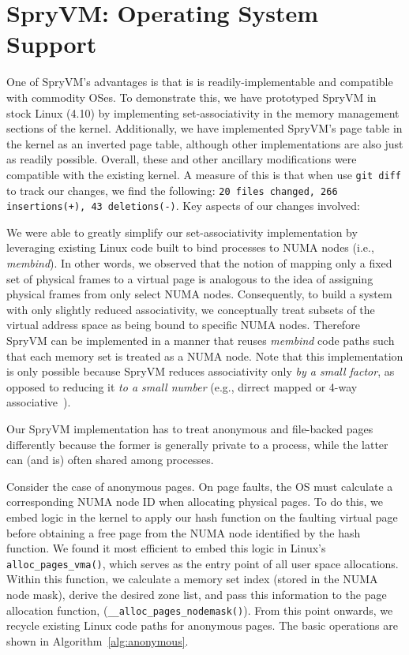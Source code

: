\section{SpryVM: Operating System Support}
\label{sec:os}

One of SpryVM's advantages is that is is readily-implementable and
compatible with commodity OSes. To demonstrate this, we have
prototyped SpryVM in stock Linux (4.10) by implementing set-associativity in
the memory management sections of the kernel. Additionally, we have
implemented SpryVM's page table in the kernel as an inverted page table,
although other implementations are also just as readily possible. 
Overall, these and other ancillary
modifications were compatible with the existing kernel. A measure of
this is that when use \verb|git diff| to track our changes, we find
the following: \texttt{20 files changed, 266 insertions(+), 43
  deletions(-)}. Key aspects of our changes involved:

\vspace{2mm}
 We were
able to greatly simplify our set-associativity implementation by
leveraging existing Linux code built to bind processes to NUMA nodes
(i.e., {\it membind}). In other words, we observed that the notion of
mapping only a fixed set of physical frames to a virtual page is
analogous to the idea of assigning physical frames from only select
NUMA nodes. Consequently, to build a system with only slightly reduced associativity, 
we conceptually treat subsets of the virtual address space as being bound to specific
NUMA nodes. Therefore SpryVM can be implemented in a manner that
reuses {\it membind} code paths such that each memory set is treated
as a NUMA node. Note that this implementation is only possible because SpryVM
reduces associativity only \textit{by a small factor}, as opposed to reducing it
\textit{to a small number} (e.g., dirrect mapped or 4-way associative~\cite{picorel:near-memory}). 


\vspace{2mm}
 Our SpryVM
implementation has to treat anonymous and file-backed pages
differently because the former is generally private to a process,
while the latter can (and is) often shared among processes.

Consider the case of anonymous pages. On page faults, the OS
must calculate a corresponding NUMA node ID when allocating physical
pages. To do this, we embed logic in the kernel to apply our hash
function on the faulting virtual page before obtaining a free page
from the NUMA node identified by the hash function. We found it most
efficient to embed this logic in Linux's \verb|alloc_pages_vma()|,
which serves as the entry point of all user space allocations. Within
this function, we calculate a memory set index (stored in the NUMA
node mask), derive the desired zone list, and pass this information to
the page allocation function, (\verb|__alloc_pages_nodemask()|). From
this point onwards, we recycle existing Linux code paths for anonymous
pages. The basic operations are shown in
Algorithm~\ref{alg:anonymous}.

